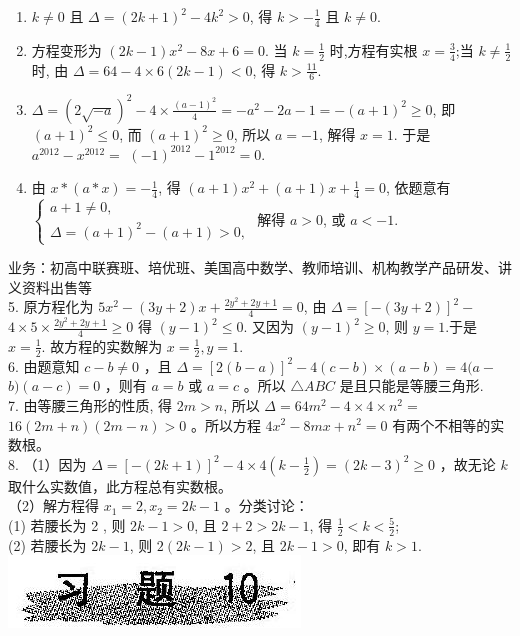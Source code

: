 \documentclass[10pt]{article}
\begin{document}
\begin{enumerate}
  \item $k \neq 0$ 且 $\Delta=(2 k+1)^{2}-4 k^{2}>0$, 得 $k>-\frac{1}{4}$ 且 $k \neq 0$.
  \item 方程变形为 $(2 k-1) x^{2}-8 x+6=0$. 当 $k=\frac{1}{2}$ 时,方程有实根 $x=\frac{3}{4}$;当 $k \neq \frac{1}{2}$ 时, 由 $\Delta=64-4 \times 6(2 k-1)<0$, 得 $k>\frac{11}{6}$.
  \item $\Delta=(2 \sqrt{-a})^{2}-4 \times \frac{(a-1)^{2}}{4}=-a^{2}-2 a-1=-(a+1)^{2} \geqslant 0$, 即 $(a+1)^{2} \leqslant 0$, 而 $(a+1)^{2} \geqslant 0$, 所以 $a=-1$, 解得 $x=1$. 于是 $a^{2012}-x^{2012}=$ $(-1)^{2012}-1^{2012}=0$.
  \item 由 $x *(a * x)=-\frac{1}{4}$, 得 $(a+1) x^{2}+(a+1) x+\frac{1}{4}=0$, 依题意有 $\left\{\begin{array}{l}a+1 \neq 0, \\ \Delta=(a+1)^{2}-(a+1)>0,\end{array}\right.$ 解得 $a>0$, 或 $a<-1$.
\end{enumerate}

业务：初高中联赛班、培优班、美国高中数学、教师培训、机构教学产品研发、讲义资料出售等\\
5. 原方程化为 $5 x^{2}-(3 y+2) x+\frac{2 y^{2}+2 y+1}{4}=0$, 由 $\Delta=[-(3 y+2)]^{2}-$ $4 \times 5 \times \frac{2 y^{2}+2 y+1}{4} \geqslant 0$ 得 $(y-1)^{2} \leqslant 0$. 又因为 $(y-1)^{2} \geqslant 0$, 则 $y=1$.于是 $x=\frac{1}{2}$. 故方程的实数解为 $x=\frac{1}{2}, y=1$.\\
6. 由题意知 $c-b \neq 0$ ，且 $\Delta=[2(b-a)]^{2}-4(c-b) \times(a-b)=4(a-$ $b)(a-c)=0$ ，则有 $a=b$ 或 $a=c$ 。所以 $\triangle A B C$ 是且只能是等腰三角形.\\
7. 由等腰三角形的性质, 得 $2 m>n$, 所以 $\Delta=64 m^{2}-4 \times 4 \times n^{2}=$ $16(2 m+n)(2 m-n)>0$ 。所以方程 $4 x^{2}-8 m x+n^{2}=0$ 有两个不相等的实数根。\\
8. （1）因为 $\Delta=[-(2 k+1)]^{2}-4 \times 4\left(k-\frac{1}{2}\right)=(2 k-3)^{2} \geqslant 0$ ，故无论 $k$ 取什么实数值，此方程总有实数根。\\
（2）解方程得 $x_{1}=2, x_{2}=2 k-1$ 。分类讨论：\\
(1) 若腰长为 2 , 则 $2 k-1>0$, 且 $2+2>2 k-1$, 得 $\frac{1}{2}<k<\frac{5}{2}$;\\
(2) 若腰长为 $2 k-1$, 则 $2(2 k-1)>2$, 且 $2 k-1>0$, 即有 $k>1$.\\
\includegraphics[max width=\textwidth, center]{2024_10_30_26b590fd1106d28139f0g-136}
\end{document}
